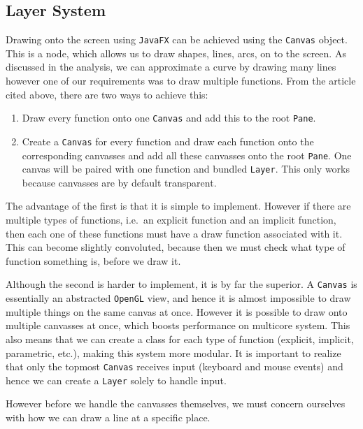 \documentclass[../../../../../main.tex]{subfiles}
\begin{document}
\subsection{Layer System}
Drawing onto the screen using \texttt{JavaFX} can be achieved using the \texttt{Canvas\cite{canvas}} object. This is a node, which allows us to draw shapes, lines, arcs, on to the screen. As discussed in the analysis, we can approximate a curve by drawing many lines however one of our requirements was to draw multiple functions. From the article cited above, there are two ways to achieve this:
\begin{enumerate}
	\item Draw every function onto one \texttt{Canvas} and add this to the root \texttt{Pane}.
	\item Create a \texttt{Canvas} for every function and draw each function onto the corresponding canvasses and add all these canvasses onto the root \texttt{Pane}. One canvas will be paired with one function and bundled \texttt{Layer}. This only works because canvasses are by default transparent.
\end{enumerate}
The advantage of the first is that it is simple to implement. However if there are multiple types of functions, i.e.\ an explicit function and an implicit function, then each one of these functions must have a draw function associated with it. This can become slightly convoluted, because then we must check what type of function something is, before we draw it.

Although the second is harder to implement, it is by far the superior. A \texttt{Canvas} is essentially an abstracted \texttt{OpenGL} view, and hence it is almost impossible\cite{openglMultithread} to draw multiple things on the same canvas at once. However it is possible to draw onto multiple canvasses at once, which boosts performance on multicore system. This also means that we can create a class for each type of function (explicit, implicit, parametric, etc.), making this system more modular. It is important to realize that only the topmost \texttt{Canvas} receives input (keyboard and mouse events) and hence we can create a \texttt{Layer} solely to handle input.

However before we handle the canvasses themselves, we must concern ourselves with how we can draw a line at a specific place.
\end{document}
